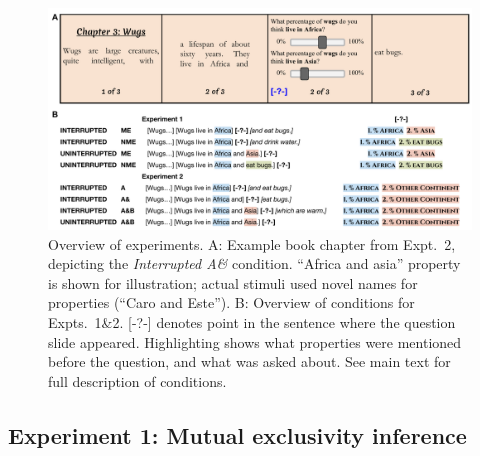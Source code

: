 \documentclass[10pt,letterpaper]{article}
\newcommand{\red}[1]{{\textcolor{Red}{#1}}}
\begin{document}


\begin{figure}[h]
  \centering
    \includegraphics[width=1\textwidth]{design}
  \caption{Overview of experiments. A: Example book chapter from Expt.~2, depicting the \emph{Interrupted A\&} condition. ``Africa and asia'' property is shown for illustration; actual stimuli used novel names for properties (``Caro and Este''). B: Overview of conditions for Expts.~1\&2. [-?-] denotes point in the sentence where the question slide appeared. Highlighting shows what properties were mentioned before the question, and what was asked about. See main text for full description of conditions.}
  \label{fig:design}
          \vspace{-0.5cm}
\end{figure}

\subsection{Experiment 1: Mutual exclusivity inference}

\end{document}
